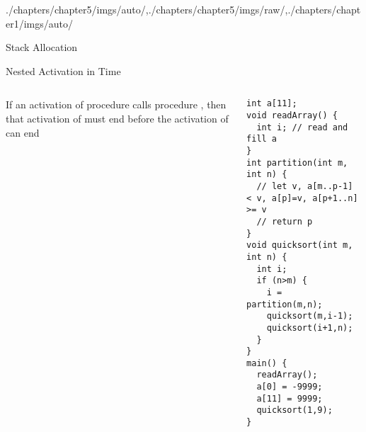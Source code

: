 \begin{graphicspathcontext}{{./chapters/chapter5/imgs/auto/},{./chapters/chapter5/imgs/raw/},{./chapters/chapter1/imgs/auto/}}
\begin{bibunit}[apalike]
\begin{frame}{Stack Allocation}
	\vspace{.5cm}
	\vspace{.5cm}
	\begin{rightarrowsequence}
	\end{rightarrowsequence}
\end{frame}

\begin{frame}[fragile]{{Nested Activation} in Time}
	\begin{small}
		\begin{columns}
			\begin{column}{.5\linewidth}
				If an activation of procedure  calls procedure , then that activation of  must end before the activation of  can end \\[.2cm]
			\end{column}
			\begin{column}{.5\linewidth}
				\begin{lstlisting}[style=lststyle-c,basicstyle=\tiny]
int a[11];
void readArray() {
  int i; // read and fill a
}
int partition(int m, int n) {
  // let v, a[m..p-1] < v, a[p]=v, a[p+1..n] >= v
  // return p
}
void quicksort(int m, int n) {
  int i;
  if (n>m) {
    i = partition(m,n);
    quicksort(m,i-1);
    quicksort(i+1,n);
  }
}
main() {
  readArray();
  a[0] = -9999;
  a[11] = 9999;
  quicksort(1,9);
}
				\end{lstlisting}
			\end{column}
		\end{columns}
	\end{small}
\end{frame}


\end{bibunit}
\end{graphicspathcontext}

